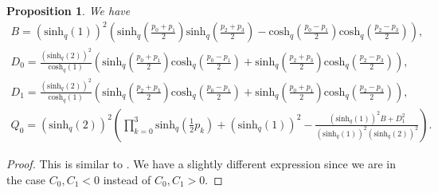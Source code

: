 \documentclass[10pt,a4paper]{amsart}
\numberwithin{equation}{section}
\newtheorem{Proposition}[Theorem]{Proposition}
 { \theoremstyle{definition}
\newtheorem{Definition}[Theorem]{Definition}
\newtheorem{Note}[Theorem]{Note}
\newtheorem{Example}[Theorem]{Example}
\newtheorem{Remark}[Theorem]{Remark} }
\newcommand{\chq}{\mathrm{cosh}_q}
\newcommand{\half}{\frac{1}{2}}
\newcommand{\shq}{\mathrm{sinh}_q}
\begin{document}
\begin{Proposition}\label{prop:BDQpk}
	We have
	\begin{gather*}
		B = (\shq(1))^2\!\left(\! \shq\!\left(\frac{p_0+p_1}{2}\right)\shq\!\left(\frac{p_2+p_3}{2}\right)- \chq\!\left(\frac{p_0-p_1}{2}\right)\chq\!\left(\frac{p_2-p_3}{2}\right)\right),\\
		D_0= \frac{(\shq(2))^2}{\chq(1)}\!\left(\!\shq\!\left(\frac{p_0+p_1}{2}\right)\chq\!\left(\frac{p_0-p_1}{2}\right)+\shq\!\left(\frac{p_2+p_3}{2}\right)\chq\!\left(\frac{p_2-p_3}{2}\right)\right),\\
		D_1= \frac{(\shq(2))^2}{\chq(1)}\!\left(\!\shq\!\left(\frac{p_2+p_3}{2}\right)\chq\!\left(\frac{p_0-p_1}{2}\right)+\shq\!\left(\frac{p_0+p_1}{2}\right)\chq\!\left(\frac{p_2-p_3}{2}\right)\right),\\
		Q_0=(\shq(2))^2\!\left( \prod_{k=0}^3\shq\!\left(\half p_k\right) + (\shq(1))^2 -\frac{(\shq(1))^2B+D_1^2}{(\shq(1))^2(\shq(2))^2}\right).
	\end{gather*}
\end{Proposition}
\begin{proof}This is similar to \cite[equation~(2.4)]{Zhedanov1991}. We have a slightly different expression since we are in the case $C_0,C_1 <0$ instead of $C_0,C_1 >0$.
\end{proof}
\end{document}
